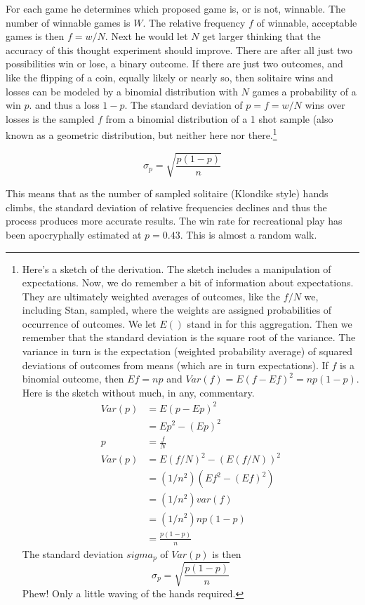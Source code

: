 \documentclass[
]{book}
\begin{document}
For each game he determines which proposed game is, or is not, winnable. The number of winnable games is \(W\). The relative frequency \(f\) of winnable, acceptable games is then \(f = w/N\). Next he would let \(N\) get larger thinking that the accuracy of this thought experiment should improve. There are after all just two possibilities win or lose, a binary outcome. If there are just two outcomes, and like the flipping of a coin, equally likely or nearly so, then solitaire wins and losses can be modeled by a binomial distribution with \(N\) games a probability of a win \(p\). and thus a loss \(1-p\). The standard deviation of \(p = f =w/N\) wins over losses is the sampled \(f\) from a binomial distribution of a 1 shot sample (also known as a geometric distribution, but neither here nor there.\footnote{Here's a sketch of the derivation. The sketch includes a manipulation of expectations. Now, we do remember a bit of information about expectations. They are ultimately weighted averages of outcomes, like the \(f/N\) we, including Stan, sampled, where the weights are assigned probabilities of occurrence of outcomes. We let \(E()\) stand in for this aggregation. Then we remember that the standard deviation is the square root of the variance. The variance in turn is the expectation (weighted probability average) of squared deviations of outcomes from means (which are in turn expectations). If \(f\) is a binomial outcome, then \(Ef = np\) and \(Var(f) = E(f-Ef)^2 = np(1-p)\). Here is the sketch without much, in any, commentary.
  \[
  \begin{align}
  Var(p) &= E(p-Ep)^2 \\
  &= Ep^2 - (Ep)^2 \\
  p &= \frac{f}{N} \\
  Var(p) &= E(f/N)^2 - (E(f/N))^2 \\
     &=(1/n^2)(Ef^2 - (Ef)^2) \\
     &=(1/n^2)var(f) \\
     &=(1/n^2)np(1-p) \\
     &=\frac{p(1-p)}{n}
  \end{align}
  \]
  The standard deviation \(sigma_p\) of \(Var(p)\) is then
  \[
  \sigma_p = \sqrt{\frac{p(1-p)}{n}}
  \]
  Phew! Only a little waving of the hands required.}

\[
\sigma_p = \sqrt{\frac{p(1-p)}{n}}
\]

This means that as the number of sampled solitaire (Klondike style) hands climbs, the standard deviation of relative frequencies declines and thus the process produces more accurate results. The win rate for recreational play has been apocryphally estimated at \(p=0.43\). This is almost a random walk.
\end{document}
